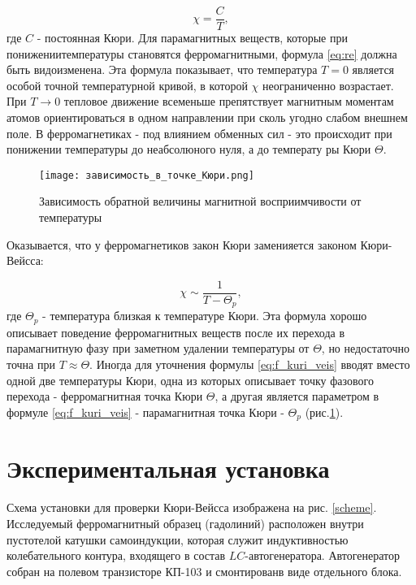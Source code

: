 \documentclass[12pt,a4paper]{article}
\begin{document}
\begin{equation}
    \chi = \frac{C}{T}, \label{eq:re}
\end{equation}
где $C$ - постоянная Кюри. 
\hyphenation{}
Для парамагнитных веществ, которые при понижениитемпературы становятся ферромагнитными, формула \eqref{eq:re}  должна быть видоизменена.
Эта формула показывает, что температура $T=0$ является особой точной температурной кривой, в которой $\chi$ неограниченно возрастает.
При $T \rightarrow 0$  тепловое движение всеменьше препятствует магнитным моментам атомов ориентироваться в одном направлении при сколь угодно слабом
 внешнем поле. В ферромагнетиках - под влиянием обменных сил - это происходит при понижении температуры до неабсолюного нуля, а до температу ры Кюри  $\Theta$.

\begin{figure}[H]
    \begin{center}
    \texttt{[image: зависимость\_в\_точке\_Кюри.png]}
    \caption{Зависимость обратной величины магнитной восприимчивости от температуры}
    \label{kuri} %
    \end{center}
\end{figure}

Оказывается, что у ферромагнетиков закон Кюри заменияется законом Кюри-Вейсса:

\begin{equation}
    \chi \sim \frac{1}{T-\Theta_p}, \label{eq:f_kuri_veis}
\end{equation}
где $\Theta_p$ - температура близкая к температуре Кюри. 
\hyphenation{}
    Эта формула хорошо описывает поведение ферромагнитных веществ после их перехода в парамагнитную фазу при заметном удалении температуры от $\Theta$, но недостаточно точна при $T\approx \Theta$.
\hyphenation{}
Иногда для уточнения формулы \ref{eq:f_kuri_veis} вводят вместо одной две температуры Кюри,  одна из которых описывает точку фазового перехода - ферромагнитная точка Кюри $\Theta$, а другая является параметром в формуле 
\ref{eq:f_kuri_veis} - парамагнитная точка Кюри - $\Theta_p$ (рис.\ref{kuri}).

\section{Экспериментальная установка}
Схема установки для проверки Кюри-Вейсса изображена на рис. \ref{scheme}. Исследуемый ферромагнитный образец (гадолиний) расположен внутри пустотелой катушки самоиндукции, которая служит индуктивностью
 колебательного контура, входящего в состав $LC$-автогенератора. Автогенератор собран на полевом транзисторе КП-103 и смонтированв виде отдельного блока.
\end{document}
